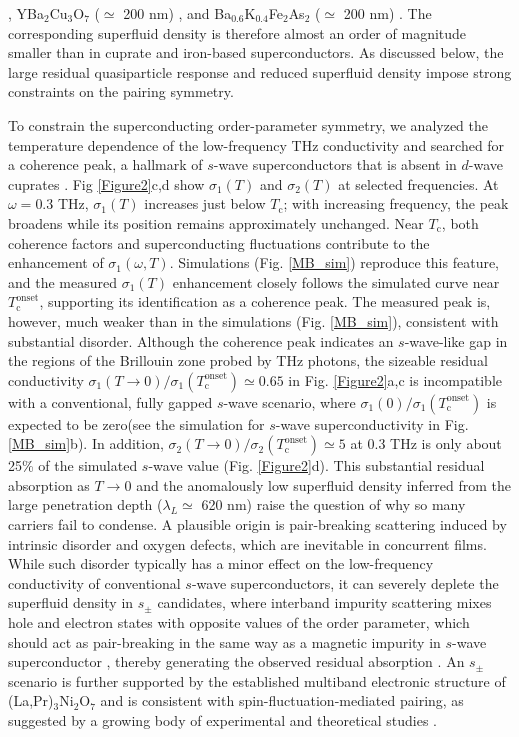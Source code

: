 \documentclass{nature}
\begin{document}
\cite{PhysRevB.50.6307,Kozhevnikov2013}, YBa$_2$Cu$_3$O$_7$ ($\simeq$ 200 nm) \cite{Mller1990,Pimenov1999}, and Ba$_{0.6}$K$_{0.4}$Fe$_{2}$As$_2$ ($\simeq$ 200 nm) \cite{Liprl2008}. The corresponding superfluid density is therefore almost an order of magnitude smaller than in cuprate and iron-based superconductors. As discussed below, the large residual quasiparticle response and reduced superfluid density impose strong constraints on the pairing symmetry.

To constrain the superconducting order-parameter symmetry, we analyzed the temperature dependence of the low-frequency THz conductivity and searched for a coherence peak, a hallmark of $s$-wave superconductors that is absent in $d$-wave cuprates \cite{PhysRevB.50.6307,Bonn1992}. Fig \ref{Figure2}c,d show $\sigma_1(T)$ and $\sigma_2(T)$ at selected frequencies. At $\omega=0.3$ THz, $\sigma_1(T)$ increases just below $T_\mathrm{c}$; with increasing frequency, the peak broadens while its position remains approximately unchanged. Near $T_\text{c}$, both coherence factors and superconducting fluctuations contribute to the enhancement of $\sigma_1(\omega,T)$. Simulations (Fig. \ref{MB_sim}) reproduce this feature, and the measured $\sigma_1(T)$ enhancement closely follows the simulated curve near $T_\mathrm{c}^{\mathrm{onset}}$, supporting its identification as a coherence peak. The measured peak is, however, much weaker than in the simulations (Fig. \ref{MB_sim}), consistent with substantial disorder. Although the coherence peak indicates an $s$-wave-like gap in the regions of the Brillouin zone probed by THz photons, the sizeable residual conductivity $\sigma_1(T \to 0)/\sigma_1(T_\mathrm{c}^{\mathrm{onset}}) \simeq 0.65$ in Fig. \ref{Figure2}a,c is incompatible with a conventional, fully gapped $s$-wave scenario, where $\sigma_1(0)/\sigma_1(T_\mathrm{c}^{\mathrm{onset}})$ is expected to be zero(see the simulation for $s$-wave superconductivity in Fig. \ref{MB_sim}b). In addition, $\sigma_2(T\rightarrow 0)/\sigma_2(T_\mathrm{c}^{\mathrm{onset}})\simeq 5$ at 0.3 THz is only about 25\% of the simulated $s$-wave value (Fig. \ref{Figure2}d). This substantial residual absorption as $T \to 0$ and the anomalously low superfluid density inferred from the large penetration depth ($\lambda_L \simeq $ 620 nm) raise the question of why so many carriers fail to condense. A plausible origin is pair-breaking scattering induced by intrinsic disorder and oxygen defects, which are inevitable in concurrent films. While such disorder typically has a minor effect on the low-frequency conductivity of conventional $s$-wave superconductors, it can severely deplete the superfluid density in $s_\pm$ candidates, where interband impurity scattering mixes hole and electron states with opposite values of the order parameter, which should act as pair-breaking in the same way as a magnetic impurity in $s$-wave superconductor \cite{Mazin2008}, thereby generating the observed residual absorption \cite{Aguilar2010}. An $s_{\pm}$ scenario is further supported by the established multiband electronic structure of (La,Pr)$_3$Ni$_2$O$_7$ and is consistent with spin-fluctuation-mediated pairing, as suggested by a growing body of experimental and theoretical studies \cite{Zhang2023,Shi2025Spin,Meng2024,Zhang2024NC,Liu2023,Gu2025,Tian2024}.
\end{document}
